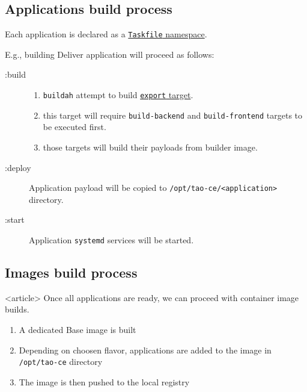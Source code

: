 \subsection{Applications build process}
\begin{frame}
    Each application is declared as a \href{https://github.com/tao-ce/tao-ce/blob/main/apps/Taskfile.yml\#L43-L58}{\texttt{Taskfile} namespace}. 

    E.g., building Deliver application will proceed as follows: 
    \begin{description}
    \item[:build] \begin{enumerate}
        \item \texttt{buildah} attempt to build \href{https://github.com/tao-ce/tao-ce/blob/main/apps/deliver/Containerfile.in\#L52-L64}{\texttt{export} target}.
        \item this target will require \texttt{build-backend} and \texttt{build-frontend} targets to be executed first.
        \item those targets will build their payloads from builder image.
    \end{enumerate}
    \item[:deploy] Application payload will be copied to \texttt{/opt/tao-ce/<application>} directory.
    \item[:start] Application \texttt{systemd} services will be started.
    \end{description}
\end{frame}

\subsection<article>{Images build process}
\begin{frame}<article>
    Once all applications are ready, we can proceed with container image builds.

    \bigicon{\faCamera}

    \begin{enumerate}
        \item A dedicated Base image is built
        \item Depending on choosen \alert{flavor}, applications are added to the image in \texttt{/opt/tao-ce} directory
        \item The image is then pushed to the local registry
    \end{enumerate}
\end{frame}

